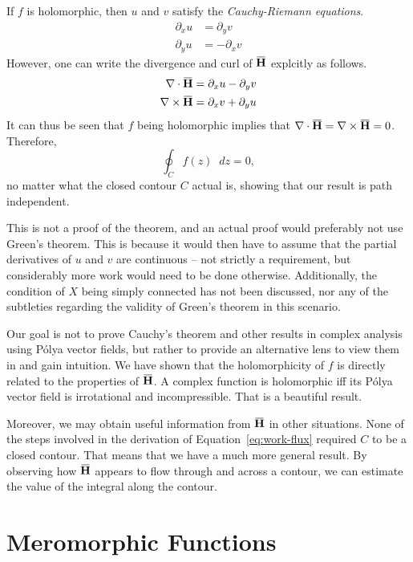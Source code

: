 \documentclass[a4paper]{article}
\newcommand*\diff{\mathop{}\!d} %
\newcommand{\overbar}[1]{\mkern 1.5mu\overline{\mkern-1.5mu#1\mkern-1.5mu}\mkern 1.5mu}
\theoremstyle{definition}
\begin{document}
If $f$ is holomorphic, then $u$ and $v$ satisfy the \emph{Cauchy-Riemann equations}.
\begin{align*}
    \partial_x u & = \partial_y v  \\
    \partial_y u & = -\partial_x v
\end{align*}
However, one can write the divergence and curl of $\mathbf{\overbar{H}}$ explcitly as follows.
\begin{align*}
    \nabla \cdot \mathbf{\overbar{H}}  & = \partial_x u - \partial_y v \\
    \nabla \times \mathbf{\overbar{H}} & = \partial_x v + \partial_y u
\end{align*}
It can thus be seen that $f$ being holomorphic implies that $\nabla \cdot \mathbf{\overbar{H}} = \nabla \times \mathbf{\overbar{H}} = 0$.
Therefore,
\begin{equation}
    \oint_C f(z) \diff z = 0,
\end{equation}
no matter what the closed contour $C$ actual is, showing that our result is path independent.

This is not a proof of the theorem, and an actual proof would preferably not use Green's theorem.
This is because it would then have to assume that the partial derivatives of $u$ and $v$ are continuous -- not strictly a requirement, but considerably more work would need to be done otherwise.
Additionally, the condition of $X$ being simply connected has not been discussed, nor any of the subtleties regarding the validity of Green's theorem in this scenario.

Our goal is not to prove Cauchy's theorem and other results in complex analysis using P\'olya vector fields, but rather to provide an alternative lens to view them in and gain intuition.
We have shown that the holomorphicity of $f$ is directly related to the properties of $\mathbf{\overbar{H}}$.
A complex function is holomorphic iff its P\'olya vector field is irrotational and incompressible.
That is a beautiful result.

Moreover, we may obtain useful information from $\mathbf{\overbar{H}}$ in other situations.
None of the steps involved in the derivation of Equation~\eqref{eq:work-flux} required $C$ to be a closed contour.
That means that we have a much more general result.
By observing how $\mathbf{\overbar{H}}$ appears to flow through and across a contour, we can estimate the value of the integral along the contour.

\section{Meromorphic Functions}
\end{document}
